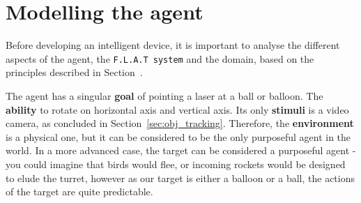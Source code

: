 \section{Modelling the agent}\label{Design:MI}
Before developing an intelligent device, it is important to analyse the different aspects of the agent, the \texttt{F.L.A.T system} and the domain, based on the principles described in Section~.


The agent has a singular \textbf{goal} of pointing a laser at a ball or balloon.
The \textbf{ability} to rotate on horizontal axis and vertical axis.
Its only \textbf{stimuli} is a video camera, as concluded in Section~\ref{sec:obj_tracking}.
Therefore, the \textbf{environment} is a physical one, but it can be considered to be the only purposeful agent in the world.
In a more advanced case, the target can be considered a purposeful agent - you could imagine that birds would flee, or incoming rockets would be designed to elude the turret, however as our target is either a balloon or a ball, the actions of the target are quite predictable.

